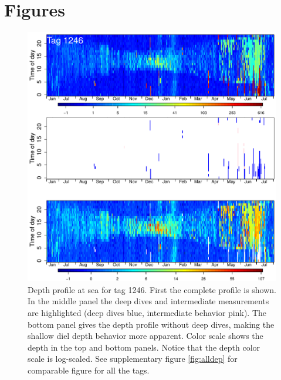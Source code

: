 \section*{Figures}
\begin{figure}[ht]
  \centering
  \includegraphics[width=\linewidth]{fig1}
  \caption{Depth profile at sea for tag 1246. First the complete profile is shown. In the middle panel the deep dives and intermediate measurements are highlighted (deep dives blue, intermediate behavior pink). 
The bottom panel gives the depth profile without deep dives, making the
shallow diel depth behavior more apparent. 
Color scale shows the depth in the top and bottom panels. Notice that the depth color scale is log-scaled. See supplementary figure \ref{fig:alldep} for comparable figure for all the tags.}
  \label{fig:heatmap}
\end{figure}

